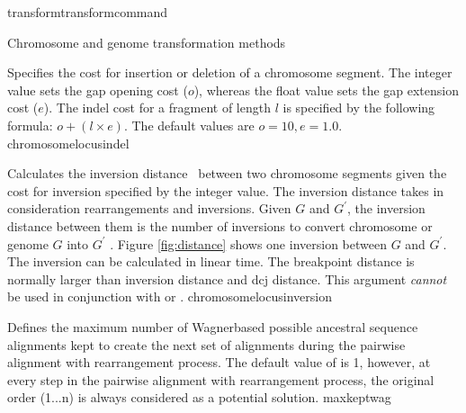 \begin{command}{transform}{transformcommand}
\begin{arguments}
\begin{argumentgroup}{Chromosome and genome transformation methods}
\begin{description}
                    {Specifies the cost for insertion or deletion of a
                    chromosome segment. The integer value sets the gap opening
                    cost ($o$), whereas the float value sets the gap extension
                    cost ($e$).  The indel cost for a fragment of length $l$ is
                    specified by the following formula:
                        $o + (l \times e)$. The default values are $o=10, e=1.0$.}
                    {chromosomelocusindel}
                        
                    {Calculates the inversion distance~\cite{hanenhalliandpevzner1995}
                    between two chromosome segments given the cost for inversion
                    specified by the integer value. The inversion distance
                    takes in consideration rearrangements and
                    inversions. Given $G$ and $G^\prime$, the inversion distance between
                    them is the number of inversions to convert chromosome or genome $G$ 
                    into $G^\prime$ \cite{hanenhalliandpevzner1995}. Figure \ref{fig:distance} shows one inversion  
                    between $G$ and $G^\prime$. The inversion can be calculated in linear time.
                    The breakpoint distance is normally larger than
                    inversion distance  and dcj distance.
                    This argument \emph{cannot} be used in conjunction with
                     or .} 
                    {chromosomelocusinversion}  
                    
                    {Defines the maximum number of Wagner\-based possible ancestral sequence
                    alignments kept to create the next set of alignments during the pairwise alignment
                    with rearrangement process.  The default value of  is 1,
                    however, at every step in the pairwise alignment with rearrangement process, the original
                    order (1...n) is always considered as a potential solution.}
                    {maxkeptwag}
                 

\end{description}
\end{argumentgroup}
\end{arguments}
\end{command}
